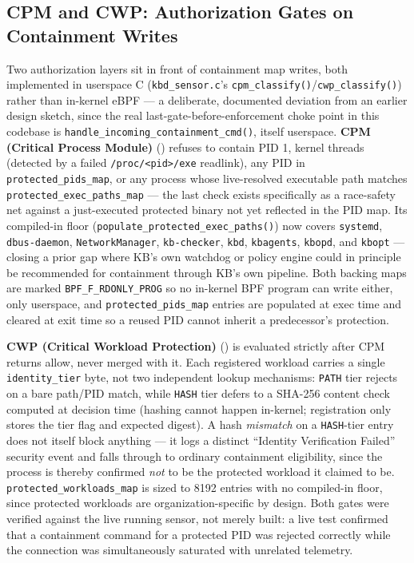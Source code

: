 \documentclass{article}
\begin{document}
\subsection{CPM and CWP: Authorization Gates on Containment Writes}
\label{sec:cpm-cwp}

Two authorization layers sit in front of containment map writes, both
implemented in userspace C (\texttt{kbd\_sensor.c}'s
\texttt{cpm\_classify()}/\texttt{cwp\_classify()}) rather than in-kernel
eBPF --- a deliberate, documented deviation from an earlier design
sketch, since the real last-gate-before-enforcement choke point in this
codebase is \texttt{handle\_incoming\_containment\_cmd()}, itself
userspace. \textbf{CPM (Critical Process Module)}
() refuses to contain PID 1, kernel threads (detected by
a failed \texttt{/proc/\textless pid\textgreater/exe} readlink), any
PID in \texttt{protected\_pids\_map}, or any process whose live-resolved
executable path matches \texttt{protected\_exec\_paths\_map} --- the
last check exists specifically as a race-safety net against a
just-executed protected binary not yet reflected in the PID map. Its
compiled-in floor (\texttt{populate\_protected\_exec\_paths()}) now
covers \texttt{systemd}, \texttt{dbus-daemon}, \texttt{NetworkManager},
\texttt{kb-checker}, \texttt{kbd}, \texttt{kbagents}, \texttt{kbopd},
and \texttt{kbopt} --- closing a prior gap where KB's own watchdog or
policy engine could in principle be recommended for containment through
KB's own pipeline. Both backing maps are marked
\texttt{BPF\_F\_RDONLY\_PROG} so no in-kernel BPF program can write
either, only userspace, and \texttt{protected\_pids\_map} entries are
populated at exec time and cleared at exit time so a reused PID cannot
inherit a predecessor's protection.

\textbf{CWP (Critical Workload Protection)} () is
evaluated strictly after CPM returns allow, never merged with it. Each
registered workload carries a single \texttt{identity\_tier} byte, not
two independent lookup mechanisms: \texttt{PATH} tier rejects on a bare
path/PID match, while \texttt{HASH} tier defers to a SHA-256 content
check computed at decision time (hashing cannot happen in-kernel;
registration only stores the tier flag and expected digest). A hash
\emph{mismatch} on a \texttt{HASH}-tier entry does not itself block
anything --- it logs a distinct ``Identity Verification Failed'' security
event and falls through to ordinary containment eligibility, since the
process is thereby confirmed \emph{not} to be the protected workload it
claimed to be. \texttt{protected\_workloads\_map} is sized to 8192
entries with no compiled-in floor, since protected workloads are
organization-specific by design. Both gates were verified against the
live running sensor, not merely built: a live test confirmed that a
containment command for a protected PID was rejected correctly while
the connection was simultaneously saturated with unrelated telemetry.
\end{document}
